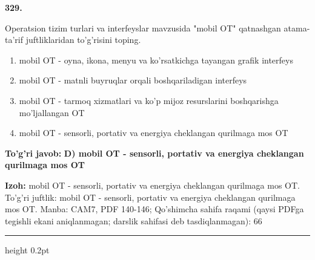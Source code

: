 \documentclass[10pt,a4paper]{article}
\begin{document}
{\bfseries\sffamily\color{ink} 329.}
\par
Operatsion tizim turlari va interfeyslar mavzusida "mobil OT" qatnashgan atama-ta'rif juftliklaridan to'g'risini toping.
\begin{enumerate}[label=\Alph*),leftmargin=9mm]
\item mobil OT - oyna, ikona, menyu va ko'rsatkichga tayangan grafik interfeys
\item mobil OT - matnli buyruqlar orqali boshqariladigan interfeys
\item mobil OT - tarmoq xizmatlari va ko'p mijoz resurslarini boshqarishga mo'ljallangan OT
\item mobil OT - sensorli, portativ va energiya cheklangan qurilmaga mos OT
\end{enumerate}
\begin{tcolorbox}[enhanced,breakable,colback=teal!4,colframe=teal!60!black,boxrule=0.45pt,arc=1.2mm,left=2.7mm,right=2.7mm,top=1.8mm,bottom=1.8mm,before skip=2mm,after skip=2mm]
{\bfseries\sffamily\color{teal}To'g'ri javob:} \textbf{D) mobil OT - sensorli, portativ va energiya cheklangan qurilmaga mos OT}
\par\smallskip
{\bfseries Izoh:} mobil OT - sensorli, portativ va energiya cheklangan qurilmaga mos OT. To'g'ri juftlik: mobil OT - sensorli, portativ va energiya cheklangan qurilmaga mos OT. Manba: CAM7, PDF 140-146; Qo'shimcha sahifa raqami (qaysi PDFga tegishli ekani aniqlanmagan; darslik sahifasi deb tasdiqlanmagan): 66
\end{tcolorbox}
\vspace{2mm}\hrule height 0.2pt\vspace{3mm}
\end{document}
